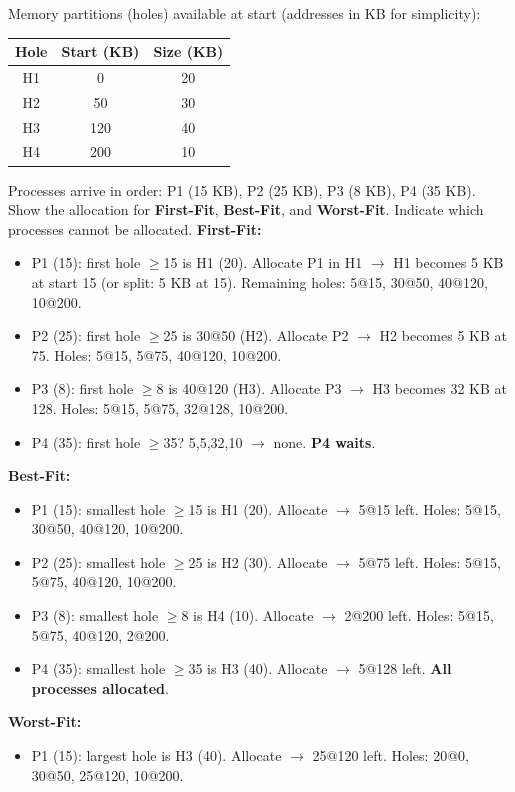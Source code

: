 \documentclass[11pt]{article}
\begin{document}
\begin{exoresolu}
Memory partitions (holes) available at start (addresses in KB for simplicity):
\begin{center}
\begin{tabular}{|c|c|c|}\hline
Hole & Start (KB) & Size (KB) \\ \hline
H1 & 0 & 20 \\
H2 & 50 & 30 \\
H3 & 120 & 40 \\
H4 & 200 & 10 \\ \hline
\end{tabular}
\end{center}
Processes arrive in order:
P1 (15 KB), P2 (25 KB), P3 (8 KB), P4 (35 KB).
Show the allocation for \textbf{First-Fit}, \textbf{Best-Fit}, and \textbf{Worst-Fit}. Indicate which processes cannot be allocated.
\tcblower
\textbf{First-Fit:}
\begin{itemize}
\item P1 (15): first hole $\ge$15 is H1 (20). Allocate P1 in H1 $\rightarrow$ H1 becomes 5 KB at start 15 (or split: 5 KB at 15). Remaining holes: 5@15, 30@50, 40@120, 10@200.
\item P2 (25): first hole $\ge$25 is 30@50 (H2). Allocate P2 $\rightarrow$ H2 becomes 5 KB at 75. Holes: 5@15, 5@75, 40@120, 10@200.
\item P3 (8): first hole $\ge$8 is 40@120 (H3). Allocate P3 $\rightarrow$ H3 becomes 32 KB at 128. Holes: 5@15, 5@75, 32@128, 10@200.
\item P4 (35): first hole $\ge$35? 5,5,32,10 $\rightarrow$ none. \textbf{P4 waits}.
\end{itemize}
\textbf{Best-Fit:}
\begin{itemize}
\item P1 (15): smallest hole $\ge$15 is H1 (20). Allocate $\rightarrow$ 5@15 left. Holes: 5@15, 30@50, 40@120, 10@200.
\item P2 (25): smallest hole $\ge$25 is H2 (30). Allocate $\rightarrow$ 5@75 left. Holes: 5@15, 5@75, 40@120, 10@200.
\item P3 (8): smallest hole $\ge$8 is H4 (10). Allocate $\rightarrow$ 2@200 left. Holes: 5@15, 5@75, 40@120, 2@200.
\item P4 (35): smallest hole $\ge$35 is H3 (40). Allocate $\rightarrow$ 5@128 left. \textbf{All processes allocated}.
\end{itemize}
\textbf{Worst-Fit:}
\begin{itemize}
\item P1 (15): largest hole is H3 (40). Allocate $\rightarrow$ 25@120 left. Holes: 20@0, 30@50, 25@120, 10@200.

\end{itemize}
\end{exoresolu}
\end{document}
